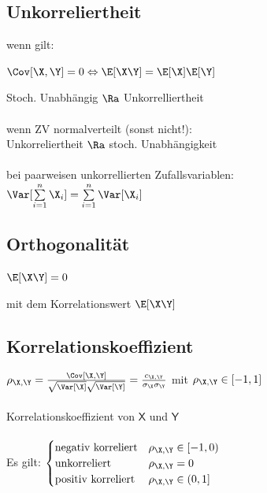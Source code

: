 \documentclass[german,color,6pt]{latex4ei/latex4ei_sheet}
\begin{document}
\begin{sectionbox}
	\subsection{Unkorreliertheit}
	wenn gilt:
	\begin{emphbox}
		$\Cov [\X,\Y] = 0 \Leftrightarrow \E[\X\Y] = \E[\X] \E[\Y]$
	\end{emphbox}
	Stoch. Unabhängig $\Ra$ Unkorrelliertheit \\\\
	wenn ZV normalverteilt (sonst nicht!):\\
	Unkorreliertheit $\Ra$ stoch. Unabhängigkeit\\\\
	bei paarweisen unkorrellierten Zufallsvariablen:\\
	$\Var[\sum \limits_{i=1}^{n} \X_i] = \sum \limits_{i=1}^{n} \Var [\X_i]$
\end{sectionbox}

\begin{sectionbox}
	\subsection{Orthogonalität}
	
	\begin{emphbox}
		$\E[\X\Y] = 0$
	\end{emphbox}
	mit dem Korrelationswert $\E[\X\Y]$
	
\end{sectionbox}

\begin{sectionbox}
	\subsection{Korrelationskoeffizient}
	$\rho_{\X,\Y} = \frac{\Cov[\X,\Y]}{\sqrt{\Var[\X]} \sqrt{\Var[\Y]}} = \frac{c_{\X,\Y}}{\sigma_{\X} \sigma_{\Y}}$ mit $\rho_{\X, \Y} \in [-1,1]$\\ \\
	Korrelationskoeffizient von $\mathsf X$ und $\mathsf Y$\\\\
	Es gilt: $\begin{cases}\text{negativ korreliert} & \rho_{\mathsf{\X,\Y}}\in [-1,0) \\ 
	\text{unkorreliert} & \rho_{\mathsf{\X,\Y}}=0 \\ 
	\text{positiv korreliert} & \rho_{\mathsf{\X,\Y}}\in (0,1]\end{cases}$
\end{sectionbox}
\end{document}
